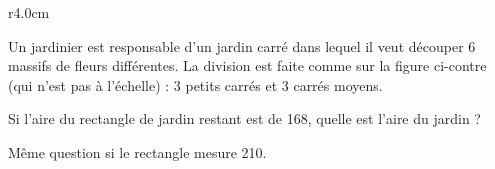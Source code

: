 
\begin{exercice}\label{exosmath-0542}

\begin{wrapfigure}{r}{4.0cm}
   \vspace{-0.5cm}        %
   \centering
   
\end{wrapfigure}

    Un jardinier est responsable d'un jardin carré dans lequel il veut découper \( 6\) massifs de fleurs différentes. La division est faite comme sur la figure ci-contre (qui n'est pas à l'échelle) : \( 3\) petits carrés et \( 3\) carrés moyens.

    Si l'aire du rectangle de jardin restant est de \unit{168}{\meter\squared}, quelle est l'aire du jardin ?

    Même question si le rectangle mesure \unit{210}{\meter\squared}.

\end{exercice}
